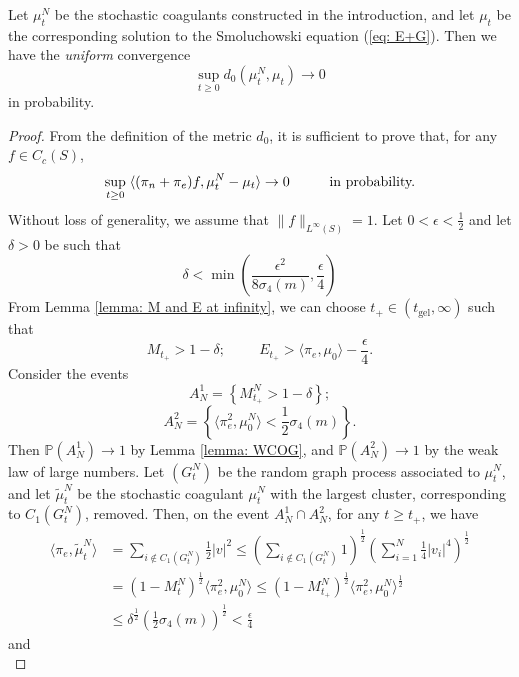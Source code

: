 \begin{lemma} \label{lemma: uniform convergence of coagulant} Let $\mu^N_t$ be the stochastic coagulants constructed in the introduction, and let $\mu_t$ be the corresponding solution to the Smoluchowski equation (\ref{eq: E+G}). Then we have the \emph{uniform} convergence \begin{equation} \sup_{t\ge 0} d_0(\mu^N_t, \mu_t) \rightarrow 0\end{equation} in probability.  \end{lemma} 
\begin{proof} From the definition of the metric $d_0$, it is sufficient to prove that, for any $f\in C_c(S)$, \begin{equation}
    \sup_{t\geq 0}\hspace{0.1cm} \langle(\pi_n+\pi_e)f, \mu^N_t-\mu_t \rangle \rightarrow 0 \hspace{1cm} \text{in probability.}
\end{equation} Without loss of generality, we assume that $\|f\|_{L^\infty(S)}=1.$ Let $0<\epsilon<\frac{1}{2}$ and let $\delta>0$ be such that \begin{equation}
    \delta< \min\left(\frac{\epsilon^2}{8\sigma_4(m)}, \frac{\epsilon}{4}\right)
\end{equation}
    From Lemma \ref{lemma: M and E at infinity}, we can choose $t_+\in (t_\text{gel}, \infty)$ such that \begin{equation}
        M_{t_+}>1-\delta;\hspace{1cm}E_{t_+}>\langle \pi_e, \mu_0\rangle -\frac{\epsilon}{4}. 
    \end{equation}Consider the events
    \begin{equation}
        A^1_N=\left\{M^N_{t_+}>1-\delta \right\};
    \end{equation}
    \begin{equation} A^2_N = \left \{\langle \pi_e^2, \mu^N_0\rangle <\frac{1}{2}\sigma_4(m)\right\}.\end{equation} Then $\mathbb{P}(A^1_N)\rightarrow 1$ by Lemma \ref{lemma: WCOG}, and $\mathbb{P}(A^2_N)\rightarrow 1$ by the weak law of large numbers. Let $(G^N_t)$ be the random graph process associated to $\mu^N_t$, and let $\widetilde{\mu}^N_t$ be the stochastic coagulant $\mu^N_t$ with the largest cluster, corresponding to $C_1(G^N_t)$, removed.  Then, on the event $A^1_N\cap A^2_N$, for any $t\geq t_+$, we have \begin{equation} \begin{split}
\langle \pi_e, \widetilde{\mu}^N_t\rangle & =\sum_{i\not \in C_1(G^N_t)}\frac{1}{2}|v|^2 \leq \left(\sum_{i \not\in C_1(G^N_t)} 1 \right)^\frac{1}{2} \left(\sum_{i =1}^N \frac{1}{4}|v_i|^4 \right)^\frac{1}{2}\\[2ex] & =(1-M^N_t)^\frac{1}{2} \langle \pi_e^2, \mu^N_0\rangle  \leq (1-M^N_{t_+})^\frac{1}{2}\langle \pi_e^2, \mu^N_0\rangle ^\frac{1}{2} \\[2ex] &\leq \delta^\frac{1}{2} \left(\frac{1}{2}\sigma_4(m)\right)^\frac{1}{2}<\frac{\epsilon}{4} \end{split} \end{equation} and \begin{equation}

\end{equation}
\end{proof}
